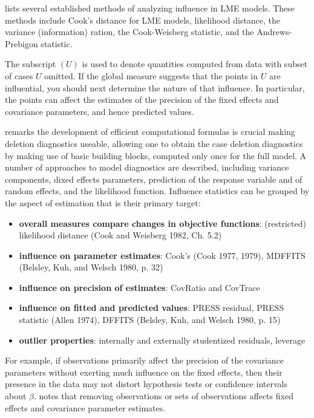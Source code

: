 \documentclass[12pt, a4paper]{report}
\theoremstyle{plain}
\theoremstyle{definition}
\theoremstyle{remark}
\begin{document}
	\citet{Zewotir} lists several established methods of analyzing influence in LME models. These methods include Cook's distance for LME models,
	 likelihood distance,
	the variance (information) ration,
	the  Cook-Weisberg statistic, and
	the  Andrews-Prebigon statistic.
	
	The subscript $(U)$ is used to denote quantities computed from data with subset of cases $U$ omitted.
	If the global measure suggests that the points in $U$ are influential, you should next determine the nature of
	that influence. In particular, the points can affect the estimates of the precision of the fixed effects and covariance parameters, and hence predicted values.

	\citet{Zewotir} remarks the development of efficient computational formulas is crucial making deletion diagnostics useable, allowing one to obtain the  case deletion diagnostics by making use of basic building blocks, computed only once for the full model. A number of approaches to model diagnostics are described, including variance components, dixed effects parameters, prediction of the response variable and of random effects, and the likelihood function. Influence statistics can be grouped by the aspect of estimation that is their primary target:
	\begin{itemize}
		\item \textbf{overall measures compare changes in objective functions}: (restricted) likelihood distance (Cook and Weisberg 1982, Ch. 5.2)
		\item \textbf{influence on parameter estimates}: Cook's  (Cook 1977, 1979), MDFFITS (Belsley, Kuh, and Welsch 1980, p. 32)
		\item \textbf{influence on precision of estimates}: CovRatio and CovTrace
		\item \textbf{influence on fitted and predicted values}: PRESS residual, PRESS statistic (Allen 1974), DFFITS (Belsley, Kuh, and Welsch 1980, p. 15)
		\item \textbf{outlier properties}: internally and externally studentized residuals, leverage
	\end{itemize}
	
	

	
	For example, if observations primarily affect the precision of the covariance parameters without exerting much influence on the fixed effects, then their presence in the data may not distort hypothesis
	tests or confidence intervals about $\beta$. 
	\citet{schabenberger} notes that removing observations or sets of observations affects fixed effects and covariance parameter estimates.
	
\end{document}
